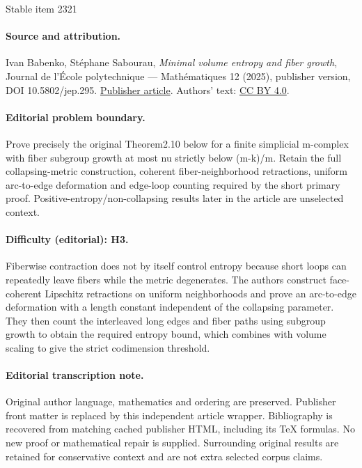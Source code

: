 \documentclass[11pt]{article}
\theoremstyle{definition}
\numberwithin{equation}{section}
\begin{document}
\begin{center}{\Large Stable item 2321}\end{center}
\paragraph{Source and attribution.}
Ivan Babenko, Stéphane Sabourau, \emph{Minimal volume entropy and fiber growth}, Journal de l’École polytechnique — Mathématiques 12 (2025), publisher version, DOI 10.5802/jep.295. \href{https://jep.centre-mersenne.org/articles/10.5802/jep.295/}{Publisher article}. Authors' text: \href{https://creativecommons.org/licenses/by/4.0/}{CC BY 4.0}.
\paragraph{Editorial problem boundary.}
Prove precisely the original Theorem2.10 below for a finite simplicial m-complex with fiber subgroup growth at most nu strictly below (m-k)/m. Retain the full collapsing-metric construction, coherent fiber-neighborhood retractions, uniform arc-to-edge deformation and edge-loop counting required by the short primary proof. Positive-entropy/non-collapsing results later in the article are unselected context.
\paragraph{Difficulty (editorial): H3.}
Fiberwise contraction does not by itself control entropy because short loops can repeatedly leave fibers while the metric degenerates. The authors construct face-coherent Lipschitz retractions on uniform neighborhoods and prove an arc-to-edge deformation with a length constant independent of the collapsing parameter. They then count the interleaved long edges and fiber paths using subgroup growth to obtain the required entropy bound, which combines with volume scaling to give the strict codimension threshold.
\paragraph{Editorial transcription note.}
Original author language, mathematics and ordering are preserved. Publisher front matter is replaced by this independent article wrapper. Bibliography is recovered from matching cached publisher HTML, including its TeX formulas. No new proof or mathematical repair is supplied. Surrounding original results are retained for conservative context and are not extra selected corpus claims.
\clearpage
\end{document}
